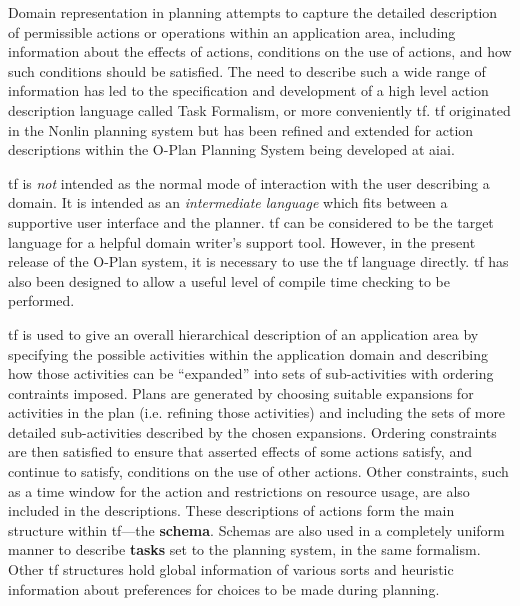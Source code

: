 \tableofcontents


Domain representation in planning attempts to capture the detailed description
of permissible actions or operations within an application area, including
information about the effects of actions, conditions on the use of actions,
and how such conditions should be satisfied.  The need to describe
such a wide range of information has led to the specification and development
of a high level action description language called Task Formalism, or more
conveniently {\sc tf}. {\sc tf} originated in the Nonlin planning system but
has been refined and extended for action descriptions within the O-Plan
Planning System being developed at {\sc aiai}.

{\sc tf} is {\em not} intended as the normal mode of interaction with the user
describing a domain.  It is intended as an {\em intermediate language} which
fits between a supportive user interface and the planner.  {\sc tf} can be
considered to be the target language for a helpful domain writer's support
tool.  However, in the present release of the O-Plan system, it is necessary
to use the {\sc tf} language directly.  {\sc tf} has also been designed to
allow a useful level of compile time checking to be performed.

{\sc tf} is used to give an overall hierarchical description of an application
area by specifying the possible activities within the application domain and 
describing how those activities can be ``expanded'' into sets of sub-activities
with ordering contraints imposed.  Plans are generated by choosing suitable
expansions for activities in the plan (i.e. refining those activities) and
including the sets of more detailed sub-activities described by the chosen
expansions.  Ordering constraints are then satisfied to ensure that asserted
effects of some actions satisfy, and continue to satisfy, conditions on the
use of other actions.  Other constraints, such as a time window for the action
and restrictions on resource usage, are also included in the descriptions.
These descriptions of actions form the main structure within {\sc tf}---the
{\bf schema}.  Schemas are also used in a completely uniform manner to
describe {\bf tasks} set to the planning system, in the same formalism.
Other {\sc tf} structures hold global information of various sorts and
heuristic information about preferences for choices to be made during
planning.

